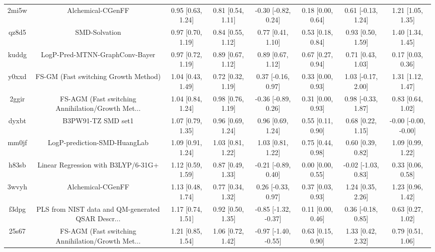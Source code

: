 \documentclass{article}
\begin{document}
\begin{center}
\begin{longtable}{|cccccccc|}
 2mi5w &                                  Alchemical-CGenFF &  0.95 [0.63, 1.24] &  0.81 [0.54, 1.11] &   -0.30 [-0.82, 0.24] &  0.18 [0.00, 0.64] &   0.61 [-0.13, 1.24] &     1.21 [1.05, 1.35] \\
 qz8d5 &                                      SMD-Solvation &  0.97 [0.70, 1.19] &  0.84 [0.55, 1.12] &     0.77 [0.41, 1.10] &  0.53 [0.18, 0.84] &    0.93 [0.50, 1.59] &     1.40 [1.34, 1.45] \\
 kuddg &                     LogP-Pred-MTNN-GraphConv-Bayer &  0.97 [0.72, 1.19] &  0.89 [0.67, 1.12] &     0.89 [0.67, 1.12] &  0.67 [0.27, 0.94] &    0.71 [0.43, 1.03] &     0.17 [0.03, 0.36] \\
 y0xxd &               FS-GM (Fast switching Growth Method) &  1.04 [0.43, 1.49] &  0.72 [0.32, 1.19] &    0.37 [-0.16, 0.97] &  0.33 [0.00, 0.93] &   1.03 [-0.17, 2.00] &     1.31 [1.12, 1.47] \\
 2ggir &  FS-AGM (Fast switching Annihilation/Growth Met... &  1.04 [0.84, 1.24] &  0.98 [0.76, 1.19] &   -0.36 [-0.89, 0.26] &  0.31 [0.00, 0.93] &   0.98 [-0.33, 1.87] &     0.83 [0.64, 1.02] \\
 dyxbt &                                 B3PW91-TZ SMD set1 &  1.07 [0.79, 1.35] &  0.96 [0.69, 1.24] &     0.96 [0.69, 1.24] &  0.55 [0.11, 0.90] &    0.68 [0.22, 1.15] &  -0.00 [-0.00, -0.00] \\
 mm0jf &                       LogP-prediction-SMD-HuangLab &  1.09 [0.91, 1.24] &  1.03 [0.81, 1.22] &     1.03 [0.81, 1.22] &  0.75 [0.44, 0.98] &    0.60 [0.39, 0.82] &     1.09 [0.99, 1.22] \\
 h83sb &                Linear Regression with B3LYP/6-31G+ &  1.12 [0.59, 1.59] &  0.87 [0.49, 1.33] &   -0.21 [-0.89, 0.40] &  0.00 [0.00, 0.55] &  -0.02 [-1.03, 0.83] &     0.33 [0.06, 0.58] \\
 3wvyh &                                  Alchemical-CGenFF &  1.13 [0.48, 1.74] &  0.77 [0.34, 1.32] &    0.26 [-0.33, 0.97] &  0.37 [0.03, 0.93] &    1.24 [0.35, 2.26] &     1.23 [0.96, 1.42] \\
 f3dpg &  PLS from NIST data and QM-generated QSAR Descr... &  1.17 [0.74, 1.51] &  0.92 [0.50, 1.35] &  -0.85 [-1.32, -0.37] &  0.11 [0.00, 0.46] &   0.36 [-0.18, 0.85] &     0.63 [0.27, 1.02] \\
 25s67 &  FS-AGM (Fast switching Annihilation/Growth Met... &  1.21 [0.85, 1.54] &  1.06 [0.72, 1.42] &  -0.97 [-1.40, -0.55] &  0.63 [0.15, 0.90] &    1.33 [0.42, 2.32] &     0.79 [0.51, 1.06] \\

\end{longtable}
\end{center}
\end{document}
